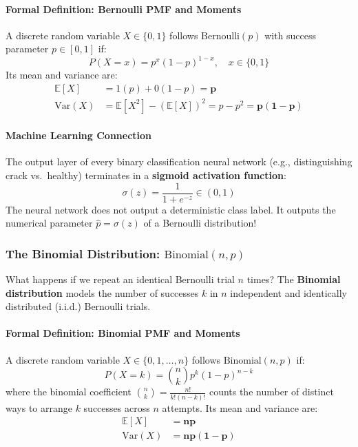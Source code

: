 \paragraph{Formal Definition: Bernoulli PMF and Moments}

A discrete random variable $X \in \{0, 1\}$ follows $\text{Bernoulli}(p)$ with success parameter $p \in [0, 1]$ if:
\begin{equation}
P(X = x) = p^x (1 - p)^{1 - x}, \quad x \in \{0, 1\}\label{eq:bernoulli_pmf}
\end{equation}
Its mean and variance are:
\begin{align}
\mathbb{E}[X] &= 1(p) + 0(1 - p) = \mathbf{p} \label{eq:bernoulli_mean}\\
\text{Var}(X) &= \mathbb{E}[X^2] - (\mathbb{E}[X])^2 = p - p^2 = \mathbf{p(1 - p)}\label{eq:bernoulli_var}
\end{align}


\paragraph{Machine Learning Connection}
The output layer of every binary classification neural network (e.g., distinguishing crack vs.\ healthy) terminates in a \textbf{sigmoid activation function}:
\begin{equation}
\sigma(z) = \frac{1}{1 + e^{-z}} \in (0, 1)
\end{equation}
The neural network does not output a deterministic class label. It outputs the numerical parameter $\hat{p} = \sigma(z)$ of a Bernoulli distribution!

\subsubsection{The Binomial Distribution: $\text{Binomial}(n, p)$}
What happens if we repeat an identical Bernoulli trial $n$ times? The \textbf{Binomial distribution} models the number of successes $k$ in $n$ independent and identically distributed (i.i.d.) Bernoulli trials.

\paragraph{Formal Definition: Binomial PMF and Moments}

A discrete random variable $X \in \{0, 1, \dots, n\}$ follows $\text{Binomial}(n, p)$ if:
\begin{equation}
P(X = k) = \binom{n}{k} p^k (1 - p)^{n - k}\label{eq:binomial_pmf}
\end{equation}
where the binomial coefficient $\binom{n}{k} = \frac{n!}{k!(n - k)!}$ counts the number of distinct ways to arrange $k$ successes across $n$ attempts.
Its mean and variance are:
\begin{align}
\mathbb{E}[X] &= \mathbf{np} \label{eq:binomial_mean}\\
\text{Var}(X) &= \mathbf{np(1 - p)}\label{eq:binomial_var}
\end{align}


